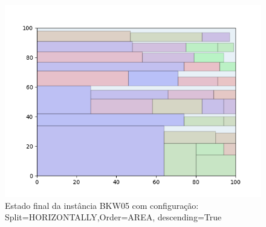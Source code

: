 \begin{figure}[H]
    \centering
    \caption[]{Estado final da instância BKW05 com configuração: Split=HORIZONTALLY,Order=AREA, descending=True}
    \label{fig:bkw05-horizontally-area-true}
    \includegraphics[scale=0.5]{output/figures/bkw/bkw05/horizontally/area/true/00}
\end{figure}